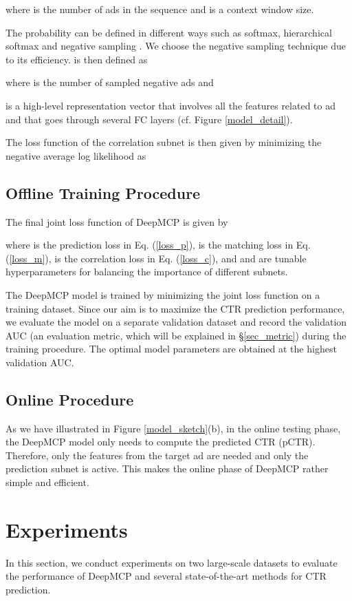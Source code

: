 \documentclass{article}
\begin{document}
where  is the number of ads in the sequence and  is a context window size.

The probability  can be defined in different ways such as softmax, hierarchical softmax and negative sampling \cite{mikolov2013distributed}. We choose the negative sampling technique due to its efficiency.  is then defined as

where  is the number of sampled negative ads and

 is a high-level representation vector that involves all the features related to ad  and that goes through several FC layers (cf. Figure \ref{model_detail}).

The loss function of the correlation subnet is then given by minimizing the negative average log likelihood as



\subsection{Offline Training Procedure}
The final joint loss function of DeepMCP is given by

where  is the prediction loss in Eq. (\ref{loss_p}),  is the matching loss in Eq. (\ref{loss_m}),  is the correlation loss in Eq. (\ref{loss_c}), and  and  are tunable hyperparameters for balancing the importance of different subnets.

The DeepMCP model is trained by minimizing the joint loss function on a training dataset.
Since our aim is to maximize the CTR prediction performance, we evaluate the model on a separate validation dataset and record the validation AUC (an evaluation metric, which will be explained in \S\ref{sec_metric}) during the training procedure. The optimal model parameters are obtained at the highest validation AUC.

\subsection{Online Procedure}
As we have illustrated in Figure \ref{model_sketch}(b), in the online testing phase, the DeepMCP model only needs to compute the predicted CTR (pCTR). Therefore, only the features from the target ad are needed and only the prediction subnet is active. This makes the online phase of DeepMCP rather simple and efficient.

\section{Experiments}
In this section, we conduct experiments on two large-scale datasets to evaluate the performance of DeepMCP and several state-of-the-art methods for CTR prediction.
\end{document}
